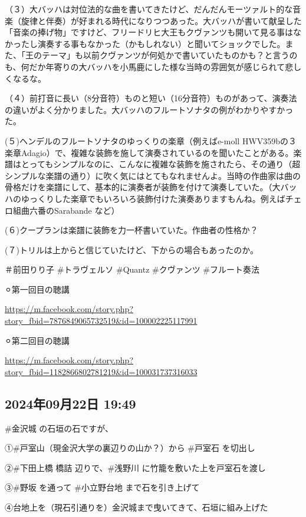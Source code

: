 （３）大バッハは対位法的な曲を書いてきたけど、だんだんモーツァルト的な音楽（旋律と伴奏）が好まれる時代になりつつあった。大バッハが書いて献呈した「音楽の捧げ物」ですけど、フリードリヒ大王もクヴァンツも開いて見る事はなかったし演奏する事もなかった（かもしれない）と聞いてショックでした。また、「王のテーマ」も以前クヴァンツが何処かで書いていたものかも？と言うのも、何だか年寄りの大バッハを小馬鹿にした様な当時の雰囲気が感じられて悲しくなるな。

（４）前打音に長い（8分音符）ものと短い（16分音符）ものがあって、演奏法の違いがよく分かりました。大バッハのフルートソナタの例がわかりやすかった。

(５)ヘンデルのフルートソナタのゆっくりの楽章（例えばe-moll HWV359bの３楽章Adagio）で、複雑な装飾を施して演奏されているのを聞いたことがある。楽譜はとってもシンプルなのに、こんなに複雑な装飾を施されたら、その通り（超シンプルな楽譜の通り）に吹く気にはとてもなれませんよ。当時の作曲家は曲の骨格だけを楽譜にして、基本的に演奏者が装飾を付けて演奏していた。（大バッハのゆっくりした楽章でもいろいろ装飾付けた演奏ありますもんね。例えばチェロ組曲六番のSarabande など）

(６)クープランは楽譜に装飾を力一杯書いていた。作曲者の性格か？

(７)トリルは上からと信じていたけど、下からの場合もあったのか。

＃前田りり子 \#トラヴェルソ \#Quantz \#クヴァンツ \#フルート奏法

⚪︎第一回目の聴講

\url{https://m.facebook.com/story.php?story_fbid=7876849065732519&id=100002225117991}

⚪︎第二回目の聴講

\url{https://m.facebook.com/story.php?story_fbid=1182866802781219&id=100031737316033}

\subsection*{2024年09月22日 19:49}

\#金沢城 の石垣の石ですが、

①\#戸室山（現金沢大学の裏辺りの山か？）から \#戸室石 を切出し

②\#下田上橋 橋詰 辺りで、\#浅野川 に竹籠を敷いた上を戸室石を渡し

③\#野坂 を通って \#小立野台地 まで石を引き上げて

④台地上を（現石引通りを）金沢城まで曳いてきて、石垣に組み上げた

